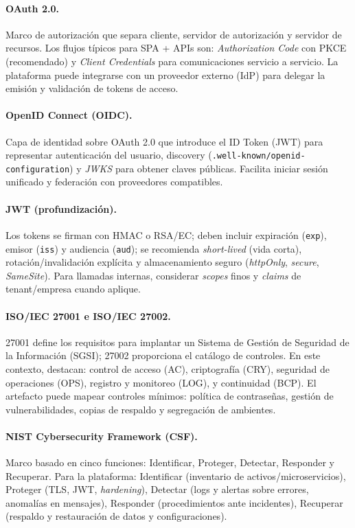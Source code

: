 \documentclass[12pt,a4paper,oneside]{report}
\begin{document}
\paragraph{OAuth 2.0.} Marco de autorización que separa cliente, servidor de autorización y servidor de recursos. Los flujos típicos para SPA + APIs son: \textit{Authorization Code} con PKCE (recomendado) y \textit{Client Credentials} para comunicaciones servicio a servicio. La plataforma puede integrarse con un proveedor externo (IdP) para delegar la emisión y validación de tokens de acceso.

\paragraph{OpenID Connect (OIDC).} Capa de identidad sobre OAuth 2.0 que introduce el ID Token (JWT) para representar autenticación del usuario, discovery (\texttt{.well-known/openid-configuration}) y \textit{JWKS} para obtener claves públicas. Facilita iniciar sesión unificado y federación con proveedores compatibles.

\paragraph{JWT (profundización).} Los tokens se firman con HMAC o RSA/EC; deben incluir expiración (\texttt{exp}), emisor (\texttt{iss}) y audiencia (\texttt{aud}); se recomienda \textit{short-lived} (vida corta), rotación/invalidación explícita y almacenamiento seguro (\textit{httpOnly}, \textit{secure}, \textit{SameSite}). Para llamadas internas, considerar \textit{scopes} finos y \textit{claims} de tenant/empresa cuando aplique.

\paragraph{ISO/IEC 27001 e ISO/IEC 27002.} 27001 define los requisitos para implantar un Sistema de Gestión de Seguridad de la Información (SGSI); 27002 proporciona el catálogo de controles. En este contexto, destacan: control de acceso (AC), criptografía (CRY), seguridad de operaciones (OPS), registro y monitoreo (LOG), y continuidad (BCP). El artefacto puede mapear controles mínimos: política de contraseñas, gestión de vulnerabilidades, copias de respaldo y segregación de ambientes.

\paragraph{NIST Cybersecurity Framework (CSF).} Marco basado en cinco funciones: Identificar, Proteger, Detectar, Responder y Recuperar. Para la plataforma: Identificar (inventario de activos/microservicios), Proteger (TLS, JWT, \textit{hardening}), Detectar (logs y alertas sobre errores, anomalías en mensajes), Responder (procedimientos ante incidentes), Recuperar (respaldo y restauración de datos y configuraciones).
\end{document}
